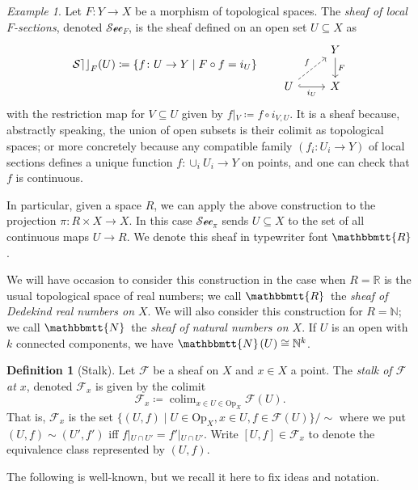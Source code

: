 \documentclass[11pt, oneside, article]{memoir}
\theoremstyle{plain}
\theoremstyle{definition}
\newtheorem{definition}[theorem]{Definition}
\theoremstyle{remark}
\newtheorem{example}[theorem]{Example}
\renewcommand{\ss}{\subseteq}
\DeclareMathOperator*{\colim}{colim}
\newcommand{\Set}[1]{\mathrm{#1}}
\newcommand{\fun}[1]{\mathcal{#1}}
\newcommand{\sheaf}[1]{\fun{#1}}
\newcommand{\internal}[1]{\raisebox{-.03ex}{$\mathbbmtt{#1}$}}
\renewcommand{\sec}{\sheaf{Sec}}
\newcommand{\hs}{\hspace{1.1pt}}
\newcommand{\nn}{\mathbb{N}}
\newcommand{\rr}{\mathbb{R}}
\newcommand{\tnn}{\internal{N}\hs}
\newcommand{\trr}{\internal{R}\hs}
\newcommand{\Op}{\Set{Op}}
\newcommand{\rest}[2]{#1\big|\hspace{0in}_{#2}}
\begin{document}
\begin{example}\label{ex.sections}
Let $F\colon Y\to X$ be a morphism of topological spaces. The \emph{sheaf of local $F$-sections}, denoted $\sec_F$, is the sheaf defined on an open set $U\ss X$ as
\begin{equation}\label{eqn.sections}
\sec_F(U)\coloneqq\{f\colon U\to Y\mid F\circ f=i_U\}
\qquad
\begin{tikzcd}
	&Y\ar[d, "F"]\\
	U\ar[r, hook, "i_U"']\ar[ur, dashed, "f"]&
	X
\end{tikzcd}
\end{equation}
with the restriction map for $V\ss U$ given by $\rest{f}{V}\coloneqq f\circ i_{V,U}$. It is a sheaf because, abstractly speaking, the union of open subsets is their colimit as topological spaces; or more concretely because any compatible family $(f_i\colon U_i\to Y)$ of local sections defines a unique function $f\colon \cup_iU_i\to Y$ on points, and one can check that $f$ is continuous.

In particular, given a space $R$, we can apply the above construction to the projection $\pi\colon R\times X\to X$. In this case $\sec_\pi$ sends $U\ss X$ to the set of all continuous maps $U\to R$. We denote this sheaf in typewriter font $\internal{R}$.

We will have occasion to consider this construction in the case when $R=\rr$ is the usual topological space of real numbers; we call $\trr$ the \emph{sheaf of Dedekind real numbers on $X$}. We will also consider this construction for $R=\nn$; we call $\tnn$ the \emph{sheaf of natural numbers on $X$}. If $U$ is an open with $k$ connected components, we have $\tnn(U)\cong\nn^k$.
\end{example}

\begin{definition}[Stalk]
Let $\sheaf{F}$ be a sheaf on $X$ and $x\in X$ a point. The \emph{stalk of $\sheaf{F}$ at $x$}, denoted $\sheaf{F}_x$ is given by the colimit
\[\sheaf{F}_x\coloneqq\colim_{x\in U\in\Op_X}\sheaf{F}(U).\]
That is, $\sheaf{F}_x$ is the set $\{(U,f)\mid U\in\Op_X, x\in U, f\in \sheaf{F}(U)\}/\sim$ where we put $(U,f)\sim (U',f')$ iff $\rest{f}{U\cap U'}=\rest{f'}{U\cap U'}$. Write $[U,f]\in \sheaf{F}_x$ to denote the equivalence class represented by $(U,f)$.
\end{definition}

The following is well-known, but we recall it here to fix ideas and notation.
\end{document}
